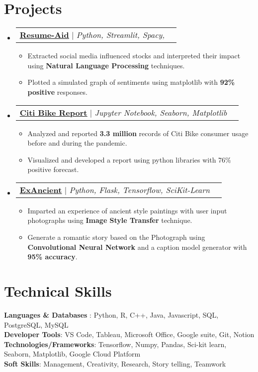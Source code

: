 \documentclass[letterpaper,11pt]{article}
\makeatletter
\newcommand{\resumeItem}[1]{
  \item\small{
    {#1 \vspace{-2pt}}
  }
}
\newcommand{\resumeProjectHeading}[2]{
    \item
    \begin{tabular*}{1.001\textwidth}{l@{\extracolsep{\fill}}r}
      \small#1 & \textbf{\small #2}\\
    \end{tabular*}\vspace{-7pt}
}
\newcommand{\resumeSubHeadingListStart}{\begin{itemize}[leftmargin=0.0in, label={}]}
\newcommand{\resumeSubHeadingListEnd}{\end{itemize}}
\newcommand{\resumeItemListStart}{\begin{itemize}}
\newcommand{\resumeItemListEnd}{\end{itemize}\vspace{-5pt}}
\makeatother
\begin{document}
\section{Projects}
    \vspace{-5pt}
    \resumeSubHeadingListStart
      \resumeProjectHeading
          {\href{https://github.com/RutvikJ77/Resume-aid}{\textbf{\underline{Resume-Aid}}} $|$ \emph{Python, Streamlit, Spacy,}}{}
          \resumeItemListStart
            \resumeItem{Extracted social media influenced stocks and interpreted their impact using \textbf{Natural Language Processing} techniques.}
            \resumeItem{Plotted a simulated graph of sentiments using matplotlib with \textbf{92\% positive} responses.}
          \resumeItemListEnd
          \vspace{-13pt}
      \resumeProjectHeading
          {\href{https://github.com/RutvikJ77/Citi-Bike-Analysis}{\textbf{\underline{Citi Bike Report}}} $|$ \emph{Jupyter Notebook, Seaborn, Matplotlib}}{}
          \resumeItemListStart
            \resumeItem{Analyzed and reported \textbf{3.3 million} records of Citi Bike consumer usage before and during the pandemic.}
            \resumeItem{Visualized and developed a report using python libraries with 76\% positive forecast.}
          \resumeItemListEnd 
          \vspace{-13pt}
          \resumeProjectHeading
              {\href{https://github.com/RutvikJ77/ExAncient}{\textbf{\underline{ExAncient}}} $|$ \emph{Python, Flask, Tensorflow, SciKit-Learn}}{}
          \resumeItemListStart
            \resumeItem{Imparted an experience of ancient style paintings with user input photographs using \textbf{Image Style Transfer} technique.}
            \resumeItem{Generate a romantic story based on the Photograph using \textbf{Convolutional Neural Network} and a caption model generator with \textbf{95\% accuracy}.}
          \resumeItemListEnd 
    \resumeSubHeadingListEnd
\vspace{-15pt}


%
\section{Technical Skills}
 \begin{itemize}[leftmargin=0.15in, label={}]
    \small{\item{
     \textbf{Languages \& Databases} {: Python, R, C++, Java, Javascript, SQL, PostgreSQL, MySQL} \\
     \textbf{Developer Tools}{: VS Code, Tableau, Microsoft Office, Google suite, Git, Notion} \\
     \textbf{Technologies/Frameworks}{: Tensorflow, Numpy, Pandas, Sci-kit learn, Seaborn, Matplotlib, Google Cloud Platform} \\
     \textbf{Soft Skills}{: Management, Creativity, Research, Story telling, Teamwork}\\
    }}
 \end{itemize}
 \vspace{-16pt}
 
\end{document}
